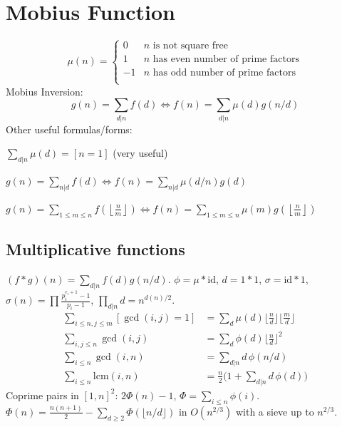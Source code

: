 \section{Mobius Function}
	\[
		\mu(n) = \begin{cases} 0 & n \textrm{ is not square free}\\ 1 & n \textrm{ has even number of prime factors}\\ -1 & n \textrm{ has odd number of prime factors}\\\end{cases}
	\]
	Mobius Inversion:
	\[ g(n) = \sum_{d|n} f(d) \Leftrightarrow f(n) = \sum_{d|n} \mu(d)g(n/d) \]
	Other useful formulas/forms:

	$ \sum_{d | n} \mu(d) = [ n = 1] $ (very useful)

	$ g(n) = \sum_{n|d} f(d) \Leftrightarrow f(n) = \sum_{n|d} \mu(d/n)g(d)$

	$ g(n) = \sum_{1 \leq m \leq n} f(\left\lfloor\frac{n}{m}\right \rfloor ) \Leftrightarrow f(n) = \sum_{1\leq m\leq n} \mu(m)g(\left\lfloor\frac{n}{m}\right\rfloor)$ \\

	\subsection{Multiplicative functions}
	$(f*g)(n)=\sum_{d|n}f(d)g(n/d)$. $\phi=\mu*\mathrm{id}$, $d=1*1$, $\sigma=\mathrm{id}*1$, $\sigma(n)=\prod\frac{p_i^{e_i+1}-1}{p_i-1}$, $\prod_{d|n}d=n^{d(n)/2}$.
	\begin{align*}
	\textstyle\sum_{i\le n,j\le m}[\gcd(i,j)=1]&=\textstyle\sum_d\mu(d)\lfloor\frac nd\rfloor\lfloor\frac md\rfloor\\
	\textstyle\sum_{i,j\le n}\gcd(i,j)&=\textstyle\sum_d\phi(d)\lfloor\frac nd\rfloor^2\\
	\textstyle\sum_{i\le n}\gcd(i,n)&=\textstyle\sum_{d|n}d\,\phi(n/d)\\
	\textstyle\sum_{i\le n}\mathrm{lcm}(i,n)&=\textstyle\frac n2\big(1+\sum_{d|n}d\,\phi(d)\big)
	\end{align*}
	Coprime pairs in $[1,n]^2$: $2\Phi(n)-1$, $\Phi=\sum_{i\le n}\phi(i)$. $\Phi(n)=\frac{n(n+1)}2-\sum_{d\ge2}\Phi(\lfloor n/d\rfloor)$ in $O(n^{2/3})$ with a sieve up to $n^{2/3}$.
